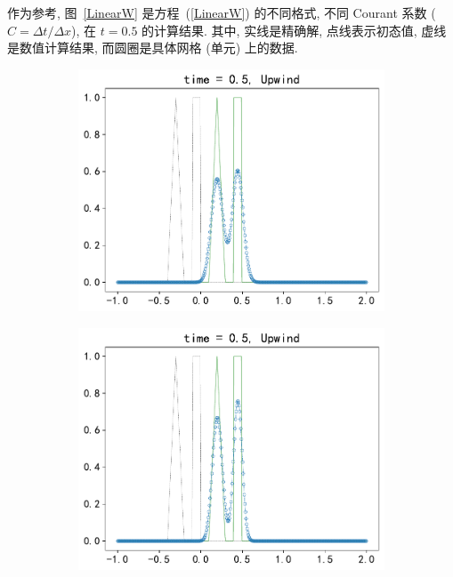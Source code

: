 \documentclass[10.5pt
]{article}
\begin{document}
作为参考, 图~\ref{LinearW} 是方程~(\ref{LinearW}) 的不同格式, 不同 Courant 系数 ($C = \Delta t / \Delta x$), 在 $t = 0.5$ 的计算结果. 其中,
实线是精确解, 点线表示初态值, 虚线是数值计算结果, 而圆圈是具体网格 (单元) 上的数据. 
\begin{figure} 
\centering
\begin{subfigure}{.48\linewidth}
	\includegraphics[width=\textwidth]{figures/problem1_upwind0.05.pdf}
  \caption{}
  \label{fig:problem1-1}
\end{subfigure}
\hfill
\begin{subfigure}{.48\linewidth}
  \includegraphics[width=\textwidth]{figures/problem1_upwind0.5.pdf} %

\end{subfigure}
\end{figure}
\end{document}
